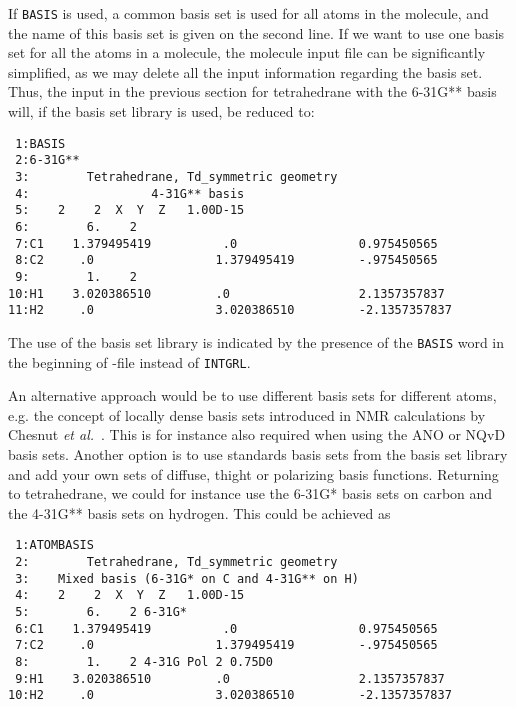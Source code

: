 If {\tt BASIS} is used, a common basis set is used for all atoms in
the molecule, and the name of this basis set is given on the second line.
If we want to use one basis set for all the
atoms in a molecule, the molecule input file can be significantly
simplified, as we may delete all the input information regarding the
basis set. Thus, the input in the previous section for tetrahedrane
with the 6-31G** basis will, if the basis set library is used,  be reduced
to:

\begin{verbatim}
 1:BASIS
 2:6-31G**
 3:        Tetrahedrane, Td_symmetric geometry
 4:                 4-31G** basis
 5:    2    2  X  Y  Z   1.00D-15
 6:        6.    2
 7:C1    1.379495419          .0                 0.975450565  
 8:C2     .0                 1.379495419         -.975450565  
 9:        1.    2
10:H1    3.020386510         .0                  2.1357357837 
11:H2     .0                 3.020386510         -2.1357357837
\end{verbatim}

The use of the basis set library is indicated by the presence of the
\verb|BASIS| word in the beginning of \mol-file instead of
\verb|INTGRL|.

An alternative approach would be to use different basis sets for
different atoms, e.g. the concept of locally dense basis sets
introduced in NMR calculations by Chesnut {\it et
al.\/}~\cite{dbcberkdmdaejcc14}. This is for instance also required
when using the ANO or NQvD
basis sets. Another option is to use 
standards basis sets from the basis set library and add your own sets 
of diffuse, thight or polarizing basis
functions. Returning to 
tetrahedrane, we could for instance use the 6-31G* basis sets on
carbon and the 4-31G** basis sets on hydrogen. This could be achieved
as

\begin{verbatim}
 1:ATOMBASIS
 2:        Tetrahedrane, Td_symmetric geometry
 3:    Mixed basis (6-31G* on C and 4-31G** on H)
 4:    2    2  X  Y  Z   1.00D-15
 5:        6.    2 6-31G*
 6:C1    1.379495419          .0                 0.975450565  
 7:C2     .0                 1.379495419         -.975450565  
 8:        1.    2 4-31G Pol 2 0.75D0
 9:H1    3.020386510         .0                  2.1357357837 
10:H2     .0                 3.020386510         -2.1357357837
\end{verbatim}


